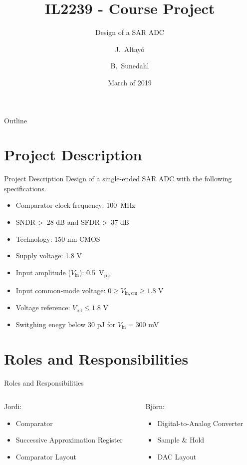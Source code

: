 \documentclass{beamer}
\title{IL2239 - Course Project}
\subtitle{Design of a SAR ADC}
\author{J.~Altayó \and B.~Sunedahl}
\date{March of 2019}
\newcommand*{\subb}[1]{\ensuremath{_{\mathrm{#1}}}}
\begin{document}
 \begin{frame}[plain, t]
  \titlepage
 \end{frame}
 
 \begin{frame}{Outline}
  \begin{multicols}{2}
   \tableofcontents
  \end{multicols}
  \end{frame}
 
 \section{Project Description}
 \begin{frame}{Project Description}
  Design of a single-ended SAR ADC with the following specifications.
  \begin{itemize}
   \item Comparator clock frequency: \SI{100}{\MHz}
   \item SNDR \textgreater\ 28 dB and SFDR \textgreater\ 37 dB
   \item Technology: 150 nm CMOS
   \item Supply voltage: 1.8 V
   \item Input amplitude ($V\subb{in}$): \SI{0.5}{\volt_{pp}}
   \item Input common-mode voltage: $0 \geq V\subb{in,cm} \geq 1.8$ V
   \item Voltage reference: $V\subb{ref} \leq 1.8$ V
   \item Switghing enegy below 30 pJ for $V\subb{in}=300$ mV
  \end{itemize}
 \end{frame}
 
 \section{Roles and Responsibilities}
 \begin{frame}{Roles and Responsibilities}
  \begin{columns}
   \begin{column}{0.5\textwidth}
    Jordi:
    \begin{itemize}
     \item Comparator
     \item Successive Approximation Register
     \item Comparator Layout
    \end{itemize}
   \end{column}
   \begin{column}{0.5\textwidth}
    Björn:
    \begin{itemize}
     \item Digital-to-Analog Converter
     \item Sample \& Hold
     \item DAC Layout
    \end{itemize}
   \end{column}
  \end{columns}
 \end{frame}
\end{document}
